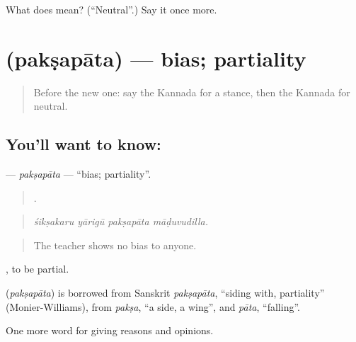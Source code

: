 \begin{tcolorbox}[breakable,colback=teal!4,colframe=teal!35!black,title={Before you move on}]
What does  mean? (\textquotedblleft{}Neutral\textquotedblright{}.) Say it once more.
\end{tcolorbox}
\section[\texorpdfstring{\kn{ಪಕ್ಷಪಾತ} (pakṣapāta)}{ಪಕ್ಷಪಾತ (pakṣapāta)}]{ (pakṣapāta) — bias; partiality}

\label{lesson:KA-C378-paksapata}



\begin{quote}
Before the new one: say the Kannada for a stance, then the Kannada for neutral.
\end{quote}

\subsection*{You'll want to know: }
\textbf{} — \emph{pakṣapāta} — \textquotedblleft{}bias; partiality\textquotedblright{}.

\begin{quote}
   .
\end{quote}

\begin{quote}
\emph{śikṣakaru yārigū pakṣapāta māḍuvudilla.}
\end{quote}

\begin{quote}
The teacher shows no bias to anyone.
\end{quote}

 , to be partial.

\begin{cousinweb}
\textbf{} (\emph{pakṣapāta}) is borrowed from Sanskrit \emph{pakṣapāta}, \textquotedblleft{}siding with, partiality\textquotedblright{} (Monier-Williams), from \emph{pakṣa}, \textquotedblleft{}a side, a wing\textquotedblright{}, and \emph{pāta}, \textquotedblleft{}falling\textquotedblright{}.
\end{cousinweb}

\begin{grammarlens}[title={What you've built}]
One more word for giving reasons and opinions.
\end{grammarlens}

